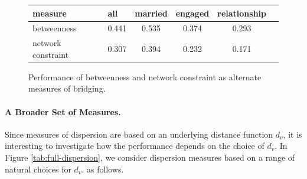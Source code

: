 \documentclass{sigchi}
\newcommand{\xhdr}[1]{\paragraph*{\bf #1.}}
\begin{document}
\begin{figure}
\begin{center}
\begin{tabular}{|l|l|c|c|c|c|}
\hline
measure & all & married & engaged & relationship \\ \hline \hline
betweenness & 0.441 & 0.535 & 0.374 & 0.293 \\ \hline \hline
network constraint & 0.307 & 0.394 & 0.232 & 0.171 \\
\hline
\end{tabular}
\end{center}
\caption{Performance of betweenness and network constraint as alternate
measures of bridging.  \label{tab:betw-nc}}
\vspace*{-0.15in}
\end{figure}

\xhdr{A Broader Set of Measures}
Since measures of dispersion are based on an underlying 
distance function $d_v$, it is interesting to investigate
how the performance depends on the choice of $d_v$.
In Figure \ref{tab:full-dispersion}, we consider
dispersion measures based on a range of natural choices for $d_v$.
as follows.
\end{document}
